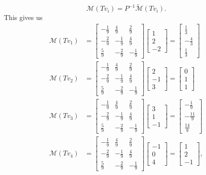 \documentclass[12pt,letterpaper]{article}
\newcommand{\M}{\mathcal{M}}
\begin{document}
\[
\M(Tv_i) = P^{-1}\tilde{\M}(Tv_i).
\]
This gives us
\begin{align*}
\M(Tv_1) &= \begin{bmatrix}
-\frac{1}{9}&\frac{4}{9}&\frac{2}{9}\\
-\frac{2}{9}&-\frac{1}{9}&\frac{4}{9}\\
\frac{5}{9}&-\frac{2}{9}&-\frac{1}{9}
\end{bmatrix}\begin{bmatrix}1\\2\\-2\end{bmatrix} = \begin{bmatrix}\frac{1}{3}\\-\frac{4}{3}\\\frac{1}{3}\end{bmatrix}\\
\M(Tv_2) &= \begin{bmatrix}
-\frac{1}{9}&\frac{4}{9}&\frac{2}{9}\\
-\frac{2}{9}&-\frac{1}{9}&\frac{4}{9}\\
\frac{5}{9}&-\frac{2}{9}&-\frac{1}{9}
\end{bmatrix}\begin{bmatrix}2\\-1\\3\end{bmatrix} = \begin{bmatrix}0\\1\\1\end{bmatrix}\\
\M(Tv_3) &= \begin{bmatrix}
-\frac{1}{9}&\frac{4}{9}&\frac{2}{9}\\
-\frac{2}{9}&-\frac{1}{9}&\frac{4}{9}\\
\frac{5}{9}&-\frac{2}{9}&-\frac{1}{9}
\end{bmatrix}\begin{bmatrix}3\\1\\-1\end{bmatrix} = \begin{bmatrix}-\frac{1}{9}\\-\frac{11}{9}\\\frac{14}{9}\end{bmatrix}\\
\M(Tv_4) &= \begin{bmatrix}
-\frac{1}{9}&\frac{4}{9}&\frac{2}{9}\\
-\frac{2}{9}&-\frac{1}{9}&\frac{4}{9}\\
\frac{5}{9}&-\frac{2}{9}&-\frac{1}{9}
\end{bmatrix}\begin{bmatrix}-1\\0\\4\end{bmatrix} = \begin{bmatrix}1\\2\\-1\end{bmatrix},
\end{align*}
\end{document}
